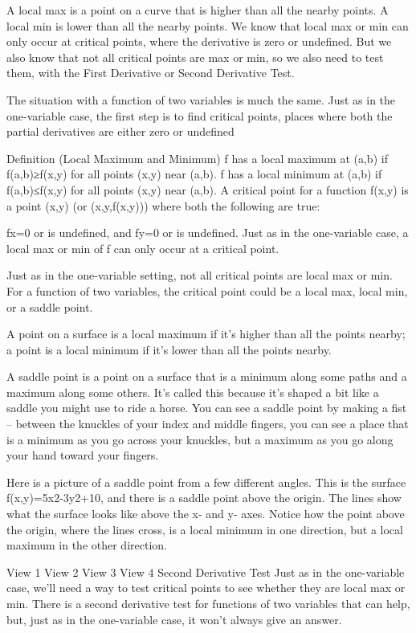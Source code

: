 A local max is a point on a curve that is higher than all the nearby points. A local min is lower than all the nearby points. We know that local max or min can only occur at critical points, where the derivative is zero or undefined. But we also know that not all critical points are max or min, so we also need to test them, with the First Derivative or Second Derivative Test.

The situation with a function of two variables is much the same. Just as in the one-variable case, the first step is to find critical points, places where both the partial derivatives are either zero or undefined

Definition (Local Maximum and Minimum)
f has a local maximum at (a,b) if f(a,b)≥f(x,y) for all points (x,y) near (a,b).
f has a local minimum at (a,b) if f(a,b)≤f(x,y) for all points (x,y) near (a,b).
A critical point for a function f(x,y) is a point (x,y) (or (x,y,f(x,y))) where both the following are true:

fx=0 or is undefined, and
fy=0 or is undefined.
Just as in the one-variable case, a local max or min of f can only occur at a critical point.

Just as in the one-variable setting, not all critical points are local max or min. For a function of two variables, the critical point could be a local max, local min, or a saddle point.

A point on a surface is a local maximum if it's higher than all the points nearby; a point is a local minimum if it's lower than all the points nearby.

A saddle point is a point on a surface that is a minimum along some paths and a maximum along some others. It's called this because it's shaped a bit like a saddle you might use to ride a horse. You can see a saddle point by making a fist – between the knuckles of your index and middle fingers, you can see a place that is a minimum as you go across your knuckles, but a maximum as you go along your hand toward your fingers.

Here is a picture of a saddle point from a few different angles. This is the surface f(x,y)=5x2-3y2+10, and there is a saddle point above the origin. The lines show what the surface looks like above the x- and y- axes. Notice how the point above the origin, where the lines cross, is a local minimum in one direction, but a local maximum in the other direction.

View 1 View 2 View 3 View 4
Second Derivative Test
Just as in the one-variable case, we'll need a way to test critical points to see whether they are local max or min. There is a second derivative test for functions of two variables that can help, but, just as in the one-variable case, it won't always give an answer.

